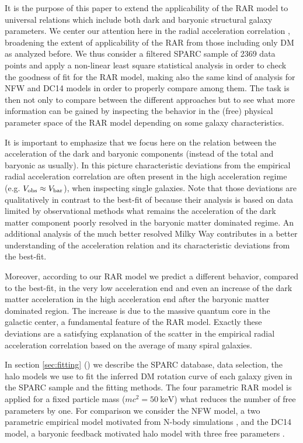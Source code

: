 It is the purpose of this paper to extend the applicability of the RAR model to universal relations which include both dark and baryonic structural galaxy parameters. We center our attention here in the radial acceleration correlation \citep{2016arXiv160905917M}, broadening the extent of applicability of the RAR from those including only DM as analyzed before. We thus consider a filtered SPARC sample of 2369 data points and apply a non-linear least square statistical analysis in order to check the goodness of fit for the RAR model, making also the same kind of analysis for NFW and DC14 models in order to properly compare among them. The task is then not only to compare between the different approaches but to see what more information can be gained by inspecting the behavior in the (free) physical parameter space of the RAR model depending on some galaxy characteristics.

It is important to emphasize that we focus here on the relation between the acceleration of the dark and baryonic components (instead of the total and baryonic as usually). In this picture characteristic deviations from the empirical radial acceleration correlation are often present in the high acceleration regime (e.g. $V_\mathrm{obs} \approx V_\mathrm{bar}$), when inspecting single galaxies. Note that those deviations are qualitatively in contrast to the best-fit of \citet{2016arXiv160905917M} because their analysis is based on data limited by observational methods what remains the acceleration of the dark matter component poorly resolved in the baryonic matter dominated regime. An additional analysis of the much better resolved Milky Way contributes in a better understanding of the acceleration relation and its characteristic deviations from the best-fit.

Moreover, according to our RAR model we predict a different behavior, compared to the best-fit, in the very low acceleration end and even an increase of the dark matter acceleration in the high acceleration end after the baryonic matter dominated region. The increase is due to the massive quantum core in the galactic center, a fundamental feature of the RAR model. Exactly these deviations are a satisfying explanation of the scatter in the empirical radial acceleration correlation based on the average of many spiral galaxies.

In section \ref{sec:fitting} () we describe the SPARC database, data selection, the halo models we use to fit the inferred DM rotation curve of each galaxy given in the SPARC sample and the fitting methods. The four parametric RAR model is applied for a fixed particle mass ($mc^2 = \SI{50}{\kilo\eV}$) what reduces the number of free parameters by one. For comparison we consider the NFW model, a two parametric empirical model motivated from N-body simulations \citep{1996ApJ...462..563N}, and the DC14 model, a baryonic feedback motivated halo model with three free parameters \citep{doi:10.1093/mnras/stu729}. 


